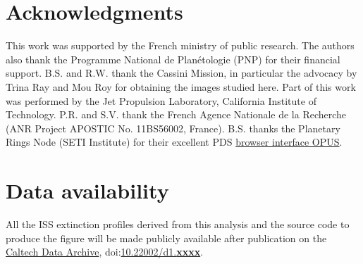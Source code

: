 \section*{Acknowledgments}

This work was supported by the French ministry of public research. The authors also thank the Programme National de Plan\'{e}tologie (PNP) for their financial support.
B.S. and R.W. thank the Cassini Mission, in particular the advocacy by Trina Ray and Mou Roy for obtaining the images studied here.
Part of this work was performed by the Jet Propulsion Laboratory, California Institute of Technology.
P.R. and S.V. thank the French Agence Nationale de la Recherche (ANR Project APOSTIC No. 11BS56002, France).
B.S. thanks the Planetary Rings Node (SETI Institute) for their excellent PDS \href{https://tools.pds-rings.seti.org/opus}{browser interface OPUS}.

\section*{Data availability}
All the ISS extinction profiles derived from this analysis and the source code to produce the figure will be made
publicly available after publication on the \href{https://data.caltech.edu}{Caltech Data Archive},
doi:\href{https://doi.org/10.22002/d1.xxxx}{10.22002/d1.\textbf{xxxx}}.